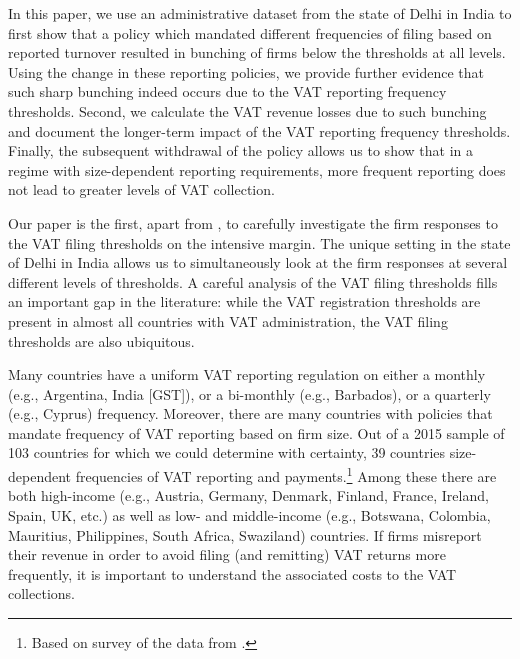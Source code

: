 In this paper, we use an administrative dataset from the state of Delhi in India to first show that a policy which mandated different frequencies of filing based on reported turnover resulted in bunching of firms below the thresholds at all levels. Using the change in these reporting policies, we provide further evidence that such sharp bunching indeed occurs due to the VAT reporting frequency thresholds. Second, we calculate the VAT revenue losses due to such bunching and document the longer-term impact of the VAT reporting frequency thresholds. Finally, the subsequent withdrawal of the policy allows us to show that in a regime with size-dependent reporting requirements, more frequent reporting does not lead to greater levels of VAT collection.

Our paper is the first, apart from \citet{asatryan2017responses}, to carefully investigate the firm responses to the VAT filing thresholds on the intensive margin. The unique setting in the state of Delhi in India allows us to simultaneously look at the firm responses at several different levels of thresholds. A careful analysis of the VAT filing thresholds fills an important gap in the literature: while the VAT registration thresholds are present in almost all countries with VAT administration, the VAT filing thresholds are also ubiquitous. 

Many countries have a uniform VAT reporting regulation on either a monthly (e.g., Argentina, India [GST]), or a bi-monthly (e.g., Barbados), or a quarterly (e.g., Cyprus) frequency. Moreover, there are many countries with policies that mandate frequency of VAT reporting based on firm size. Out of a 2015 sample of 103 countries for which we could determine with certainty, 39 countries size-dependent frequencies of VAT reporting and payments.\footnote{Based on survey of the data from \citet{ey2015worldwideguide}.} Among these there are both high-income (e.g., Austria, Germany, Denmark, Finland, France, Ireland, Spain, UK, etc.) as well as low- and middle-income (e.g., Botswana, Colombia, Mauritius, Philippines, South Africa, Swaziland) countries. If firms misreport their revenue in order to avoid filing (and remitting) VAT returns more frequently, it is important to understand the associated costs to the VAT collections. 
% 

